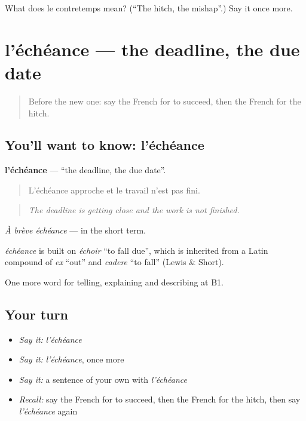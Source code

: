 \begin{tcolorbox}[breakable,colback=teal!4,colframe=teal!35!black,title={Before you move on}]
What does le contretemps mean? (\textquotedblleft{}The hitch, the mishap\textquotedblright{}.) Say it once more.
\end{tcolorbox}
\section[l'échéance]{l'échéance — the deadline, the due date}

\label{lesson:FR-C275-echeance}



\begin{quote}
Before the new one: say the French for to succeed, then the French for the hitch.
\end{quote}

\subsection*{You'll want to know: l'échéance}
\textbf{l'échéance} — \textquotedblleft{}the deadline, the due date\textquotedblright{}.

\begin{quote}
L'échéance approche et le travail n'est pas fini.
\end{quote}

\begin{quote}
\emph{The deadline is getting close and the work is not finished.}
\end{quote}

\emph{À brève échéance} — in the short term.

\begin{cousinweb}
\emph{échéance} is built on \emph{échoir} \textquotedblleft{}to fall due\textquotedblright{}, which is inherited from a Latin compound of \emph{ex} \textquotedblleft{}out\textquotedblright{} and \emph{cadere} \textquotedblleft{}to fall\textquotedblright{} (Lewis \& Short).
\end{cousinweb}

\begin{grammarlens}[title={What you've built}]
One more word for telling, explaining and describing at B1.
\end{grammarlens}

\subsection*{Your turn}
\begin{itemize}
\raggedright
  \item \emph{Say it:} \emph{l'échéance}
  \item \emph{Say it:} \emph{l'échéance}, once more
  \item \emph{Say it:} a sentence of your own with \emph{l'échéance}
  \item \emph{Recall:} say the French for to succeed, then the French for the hitch, then say \emph{l'échéance} again
\end{itemize}

